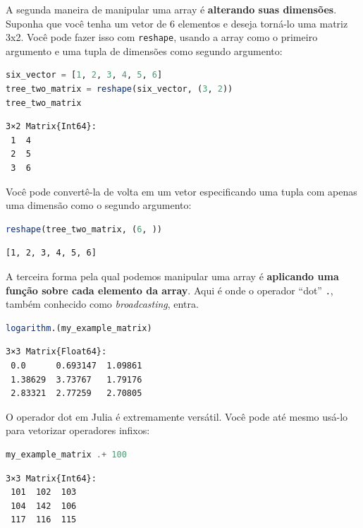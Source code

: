 \documentclass[
  notoc %
]{tufte-book}
\newcommand{\passthrough}[1]{#1}
\begin{document}
A segunda maneira de manipular uma array é \textbf{alterando suas
dimensões}. Suponha que você tenha um vetor de 6 elementos e deseja
torná-lo uma matriz 3x2. Você pode fazer isso com
\passthrough{\lstinline!reshape!}, usando a array como o primeiro
argumento e uma tupla de dimensões como segundo argumento:

\begin{lstlisting}[language=Julia]
six_vector = [1, 2, 3, 4, 5, 6]
tree_two_matrix = reshape(six_vector, (3, 2))
tree_two_matrix
\end{lstlisting}

\begin{lstlisting}[language=Output]
3×2 Matrix{Int64}:
 1  4
 2  5
 3  6
\end{lstlisting}

Você pode convertê-la de volta em um vetor especificando uma tupla com
apenas uma dimensão como o segundo argumento:

\begin{lstlisting}[language=Julia]
reshape(tree_two_matrix, (6, ))
\end{lstlisting}

\begin{lstlisting}[language=Output]
[1, 2, 3, 4, 5, 6]
\end{lstlisting}

A terceira forma pela qual podemos manipular uma array é
\textbf{aplicando uma função sobre cada elemento da array}. Aqui é onde
o operador ``dot'' \passthrough{\lstinline!.!}, também conhecido como
\emph{broadcasting}, entra.

\begin{lstlisting}[language=Julia]
logarithm.(my_example_matrix)
\end{lstlisting}

\begin{lstlisting}[language=Output]
3×3 Matrix{Float64}:
 0.0      0.693147  1.09861
 1.38629  3.73767   1.79176
 2.83321  2.77259   2.70805
\end{lstlisting}

O operador dot em Julia é extremamente versátil. Você pode até mesmo
usá-lo para vetorizar operadores infixos:

\begin{lstlisting}[language=Julia]
my_example_matrix .+ 100
\end{lstlisting}

\begin{lstlisting}[language=Output]
3×3 Matrix{Int64}:
 101  102  103
 104  142  106
 117  116  115
\end{lstlisting}
\end{document}
